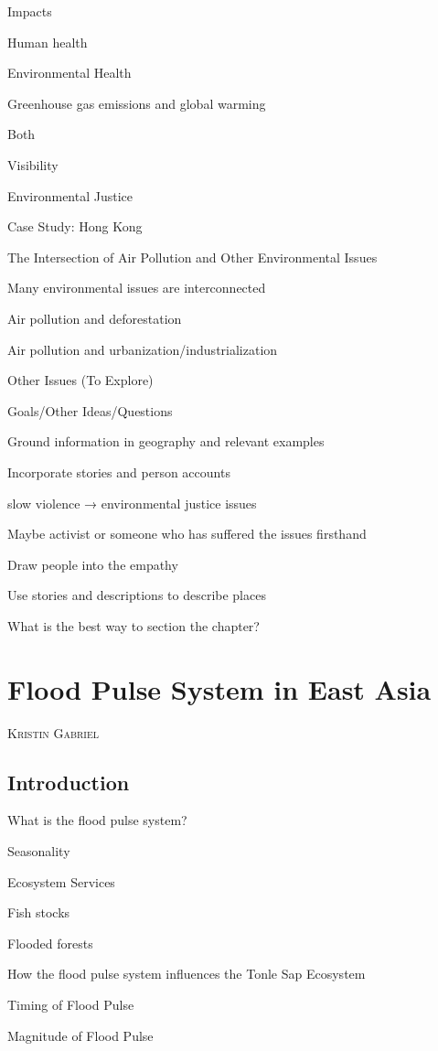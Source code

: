 \documentclass{book}\usepackage{knitr}
\makeatletter
\newcommand{\chapterauthor}[1]{%
  {\parindent0pt\vspace*{-25pt}%
  \linespread{1.1}\large\scshape#1%
  \par\nobreak\vspace*{35pt}}
  \@afterheading%
}
\makeatother
\begin{document}
Impacts

Human health

Environmental Health

Greenhouse gas emissions and global warming

Both

Visibility

Environmental Justice

Case Study: Hong Kong

The Intersection of Air Pollution and Other Environmental Issues

Many environmental issues are interconnected

Air pollution and deforestation

Air pollution and urbanization/industrialization

Other Issues (To Explore)

Goals/Other Ideas/Questions

Ground information in geography and relevant examples

Incorporate stories and person accounts

slow violence → environmental justice issues

Maybe activist or someone who has suffered the issues firsthand

Draw people into the empathy

Use stories and descriptions to describe places

What is the best way to section the chapter?


\chapter{Flood Pulse System in East Asia}

\chapterauthor{Kristin Gabriel}

\section{Introduction}

What is the flood pulse system?

Seasonality

Ecosystem Services

Fish stocks

Flooded forests

How the flood pulse system influences the Tonle Sap Ecosystem

Timing of Flood Pulse

Magnitude of Flood Pulse
\end{document}
